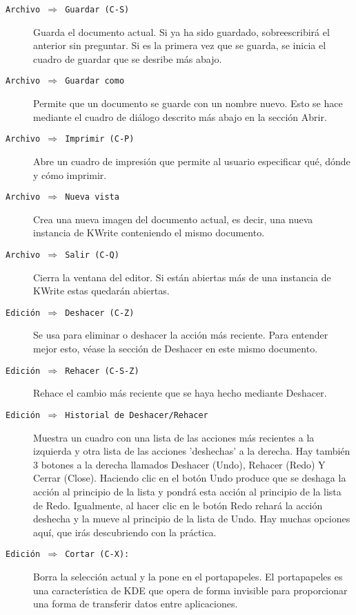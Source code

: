 \begin{description}
\item[{\tt Archivo  $\Rightarrow$ Guardar (C-S)}] Guarda  el documento
actual.  Si  ya  ha  sido guardado,  sobreescribirá  el  anterior  sin
preguntar. Si es la primera vez que  se guarda, se inicia el cuadro de
guardar que se desribe más abajo.

\item[{\tt  Archivo  $\Rightarrow$  Guardar   como}]  Permite  que  un
documento se  guarde con  un nombre  nuevo. Esto  se hace  mediante el
cuadro de diálogo descrito más abajo en la sección Abrir.

\item[{\tt Archivo  $\Rightarrow$ Imprimir  (C-P)}] Abre un  cuadro de
impresión  que  permite  al  usuario especificar  qué,  dónde  y  cómo
imprimir.

\item[{\tt Archivo  $\Rightarrow$ Nueva vista}] Crea  una nueva imagen
del documento  actual, es decir,  una nueva instancia de  {\sf KWrite}
conteniendo el mismo documento.

\item[{\tt Archivo  $\Rightarrow$ Salir (C-Q)}] Cierra  la ventana del
editor. Si están  abiertas más de una instancia de  {\sf KWrite} estas
quedarán abiertas.

\item[{\tt Edición $\Rightarrow$ Deshacer (C-Z)}] Se usa para eliminar
o deshacer la acción más reciente.  Para entender mejor esto, véase la
sección de Deshacer en este mismo documento.

\item[{\tt Edición  $\Rightarrow$ Rehacer  (C-S-Z)}] Rehace  el cambio
más reciente que se haya hecho mediante Deshacer.

\item[{\tt  Edición  $\Rightarrow$   Historial  de  Deshacer/Rehacer}]
Muestra un  cuadro con una  lista de las  acciones más recientes  a la
izquierda y otra  lista de las acciones 'deshechas' a  la derecha. Hay
también  3 botones  a  la derecha  llamados  Deshacer (Undo),  Rehacer
(Redo) Y Cerrar (Close). Haciendo clic en el botón Undo produce que se
deshaga la  acción al principio  de la lista  y pondrá esta  acción al
principio de la  lista de Redo. Igualmente, al hacer  clic en le botón
Redo rehará la acción deshecha y la  mueve al principio de la lista de
Undo. Hay muchas opciones aquí, que irás descubriendo con la práctica.

\item[{\tt Edición  $\Rightarrow$ Cortar  (C-X):}] Borra  la selección
actual  y  la  pone  en   el  portapapeles.  El  portapapeles  es  una
característica  de  {\sf  KDE}  que  opera  de  forma  invisible  para
proporcionar una forma de transferir datos entre aplicaciones.


\end{description}

